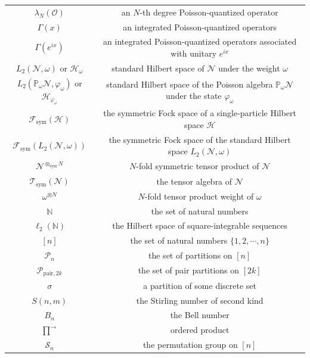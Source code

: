 \documentclass[a4paper,11pt]{article}
\theoremstyle{definition}
\numberwithin{equation}{section}
\begin{document}
\begin{longtable}[H]{c|c}
        $\lambda_N(\mathcal{O})$ & an $N$-th degree Poisson-quantized operator
        \\
        $\Gamma(x)$ & an integrated Poisson-quantized operators
        \\
        $\Gamma(e^{ix})$ & an integrated Poisson-quantized operators associated with unitary $e^{ix}$
        \\
        $L_2(\mathcal{N},\omega)$ or $\mathcal{H}_\omega$ & standard Hilbert space of $\mathcal{N}$ under the weight $\omega$
        \\
        $L_2(\mathbb{P}_\omega \mathcal{N}, \varphi_\omega)$ or $\mathcal{H}_{\varphi_\omega}$ & standard Hilbert space of the Poisson algebra $\mathbb{P}_\omega\mathcal{N}$ under the state $\varphi_\omega$
        \\
        $\mathcal{F}_\text{sym}(\mathcal{H})$ & the symmetric Fock space of a single-particle Hilbert space $\mathcal{H}$
        \\
        $\mathcal{F}_\text{sym}(L_2(\mathcal{N},\omega))$ & the symmetric Fock space of the standard Hilbert space $L_2(\mathcal{N},\omega)$
        \\
        $\mathcal{N}^{\otimes_\text{sym} N}$ & $N$-fold symmetric tensor product of $\mathcal{N}$
        \\
        $\mathcal{T}_\text{sym}(\mathcal{N})$ & the tensor algebra of $\mathcal{N}$
        \\
        $\omega^{\otimes N}$ & $N$-fold tensor product weight of $\omega$
        \\
        $\mathbb{N}$ & the set of natural numbers
        \\
        $\ell_2(\mathbb{N})$ & the Hilbert space of square-integrable sequences
        \\
        $[n]$ & the set of natural numbers $\{1,2,\cdots,n\}$
        \\
        $\mathcal{P}_n$ & the set of partitions on $[n]$
        \\
        $\mathcal{P}_{\text{pair}, 2k}$ & the set of pair partitions on $[2k]$
        \\
        $\sigma$ & a partition of some discrete set
        \\
        $S(n,m)$ & the Stirling number of second kind
        \\
        $B_n$ & the Bell number
        \\
        $\overrightarrow{\prod}$ & ordered product
        \\
        $\mathcal{S}_n$ & the permutation group on $[n]$

\end{longtable}
\end{document}
